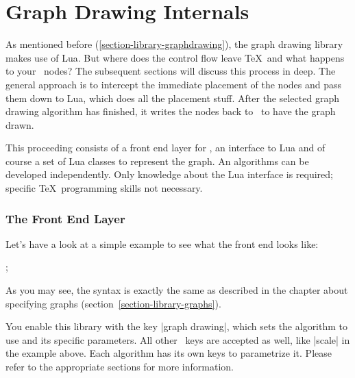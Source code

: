 %
%
%

\section{Graph Drawing Internals}
\label{section-base-graphdrawing}

As mentioned before (\ref{section-library-graphdrawing}), the graph
drawing library makes use of Lua. But where does the control flow
leave \TeX\ and what happens to your \tikzname\ nodes? The subsequent
sections will discuss this process in deep. The general approach is to
intercept the immediate placement of the nodes and pass them down to
Lua, which does all the placement stuff. After the selected graph
drawing algorithm has finished, it writes the nodes back to
\tikzname\ to have the graph drawn.

This proceeding consists of a front end layer for \tikzname, an
interface to Lua and of course a set of Lua classes to represent the
graph. An algorithms can be developed independently. Only knowledge
about the Lua interface is required; specific \TeX\ programming skills
not necessary.

\subsubsection{The Front End Layer}
Let's have a look at a simple example to see what the front end looks
like:

\begin{codeexample}[]
\tikzpicture[graph drawing={standard tree},scale=2]
  ;
\endtikzpicture
\end{codeexample}

As you may see, the syntax is exactly the same as described in the
chapter about specifying graphs (section~\ref{section-library-graphs}).

You enable this library with the key |graph drawing|, which sets the
algorithm to use and its specific parameters. All other
\tikzname\ keys are accepted as well, like |scale| in the example
above. Each algorithm has its own keys to parametrize it. Please refer to
the appropriate sections for more information.

